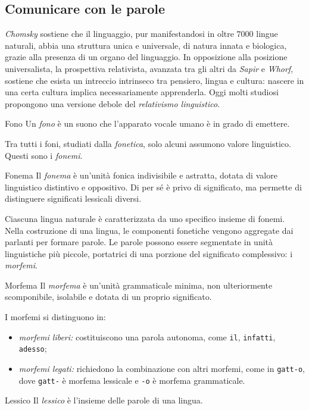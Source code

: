 \documentclass[a4paper]{article}
\begin{document}
\subsection{Comunicare con le parole}
\emph{Chomsky} sostiene che il linguaggio, pur manifestandosi in oltre \(7000\) lingue naturali, abbia una struttura unica e universale, di natura innata e biologica, grazie alla presenza di un organo del linguaggio.
In opposizione alla posizione universalista, la prospettiva relativista, avanzata tra gli altri da \emph{Sapir} e \emph{Whorf}, sostiene che esista un intreccio intrinseco tra pensiero, lingua e cultura: nascere in una certa cultura implica necessariamente apprenderla.
Oggi molti studiosi propongono una versione debole del \emph{relativismo linguistico}.
\begin{snippetdefinition}{Fono}
    Un \emph{fono} è un suono che l'apparato vocale umano è in grado di emettere.
\end{snippetdefinition}
Tra tutti i foni, studiati dalla \emph{fonetica}, solo alcuni assumono valore linguistico. Questi sono i \emph{fonemi}.
\begin{snippetdefinition}{Fonema}
    Il \emph{fonema} è un'unità fonica indivisibile e astratta, dotata di valore linguistico distintivo e oppositivo. Di per sé è privo di significato, ma permette di distinguere significati lessicali diversi.
\end{snippetdefinition}
Ciascuna lingua naturale è caratterizzata da uno specifico insieme di fonemi.
Nella costruzione di una lingua, le componenti fonetiche vengono aggregate dai parlanti per formare parole. Le parole possono essere segmentate in unità linguistiche più piccole, portatrici di una porzione del significato complessivo: i \emph{morfemi}.
\begin{snippetdefinition}{Morfema}
    Il \emph{morfema} è un'unità grammaticale minima, non ulteriormente scomponibile, isolabile e dotata di un proprio significato.
\end{snippetdefinition}
I morfemi si distinguono in:
\begin{itemize}
    \item \emph{morfemi liberi:} costituiscono una parola autonoma, come \texttt{il}, \texttt{infatti}, \texttt{adesso};
    \item \emph{morfemi legati:} richiedono la combinazione con altri morfemi, come in \texttt{gatt-o}, dove \texttt{gatt-} è morfema lessicale e \texttt{-o} è morfema grammaticale.
\end{itemize}
\begin{snippetdefinition}{Lessico}
    Il \emph{lessico} è l'insieme delle parole di una lingua.
\end{snippetdefinition}
\end{document}
